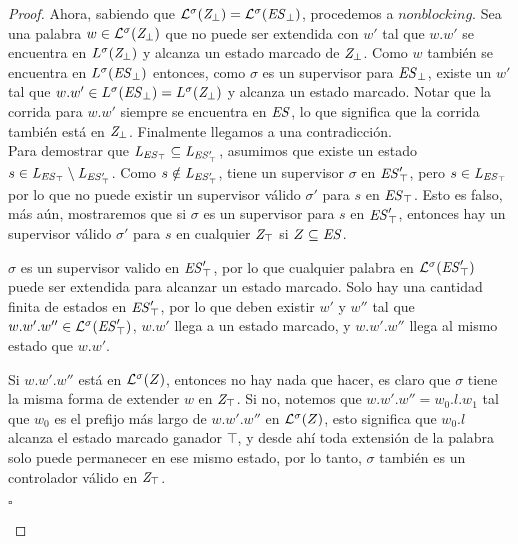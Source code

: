 \begin{proof}
Ahora, sabiendo que $\mathcal{L}^\sigma(\mathit{Z_{\bot}}) = 
\mathcal{L}^\sigma(\mathit{\mathit{ES}_{\bot}})$, procedemos a $nonblocking$. Sea una palabra $w \in 
\mathcal{L}^\sigma(\mathit{Z_{\bot}})$ que no puede ser extendida con $w'$ tal que $w.w'$ se encuentra en $L^\sigma(\mathit{Z_{\bot}})$ y alcanza un estado marcado de $\mathit{Z_{\bot}}$. 
Como $w$ también se encuentra en $L^\sigma(\mathit{\mathit{ES}_{\bot}})$ entonces, como $\sigma$ es un supervisor para $\mathit{\mathit{ES}_{\bot}}$, existe un $w'$ tal que
$w.w' \in L^\sigma(\mathit{\mathit{ES}_{\bot}}) = L^\sigma(\mathit{Z_{\bot}})$ y alcanza un estado marcado. Notar que la corrida para $w.w'$ siempre se encuentra en $\mathit{ES}$, lo que significa que la corrida también está en $\mathit{Z_{\bot}}$. Finalmente llegamos a una contradicción.\\

Para demostrar que $\mathit{L_{\mathit{\mathit{ES}_{\top}}}} \subseteq \mathit{L_{\mathit{\mathit{ES}'_{\top}}}}$, asumimos que existe un estado $s \in \mathit{L_{\mathit{\mathit{ES}_{\top}}}} \setminus \mathit{L_{\mathit{\mathit{ES}'_{\top}}}}$. Como $s \notin \mathit{L_{\mathit{\mathit{ES}'_{\top}}}}$, tiene un supervisor $\sigma$ en $\mathit{\mathit{ES}'_{\top}}$, pero $s \in \mathit{L_{\mathit{\mathit{ES}_{\top}}}}$ por lo que no puede existir un supervisor válido $\sigma'$ para $s$ en $\mathit{\mathit{ES}_{\top}}$. Esto es falso, más aún, mostraremos que si $\sigma$ es un supervisor para $s$ en $\mathit{\mathit{ES}'_{\top}}$, entonces hay un supervisor válido $\sigma'$ para $s$ en cualquier $\mathit{Z_{\top}}$ si $Z \subseteq \mathit{ES}$.

$\sigma$ es un supervisor valido en $\mathit{\mathit{ES}'_{\top}}$, por lo que cualquier palabra en $\mathcal{L}^\sigma(\mathit{\mathit{ES}'_{\top}})$ puede ser extendida para alcanzar un estado marcado. Solo hay una cantidad finita de estados en  $\mathit{\mathit{ES}'_{\top}}$, por lo que deben existir $w'$ y $w''$ tal que $w.w'.w'' \in \mathcal{L}^\sigma(\mathit{\mathit{ES}'_{\top}})$, $w.w'$ llega a un estado marcado, y $w.w'.w''$ llega al mismo estado que $w.w'$.

Si $w.w'.w''$ está en $\mathcal{L}^\sigma(Z)$, entonces no hay nada que hacer, es claro que $\sigma$ tiene la misma forma de extender $w$ en $\mathit{Z_{\top}}$. Si no, notemos que $w.w'.w'' = w_0.l.w_1$ tal que $w_0$ es el prefijo más largo de $w.w'.w''$ en $\mathcal{L}^\sigma(Z)$, esto significa que $w_0.l$ alcanza el estado marcado ganador $\top$, y desde ahí toda extensión de la palabra solo puede permanecer en ese mismo estado, por lo tanto, $\sigma$ también es un controlador válido en  $\mathit{Z_{\top}}$.
 
\begin{flushright}
$\square$
\end{flushright}

\end{proof}


